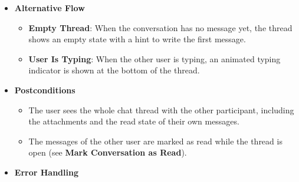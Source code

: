 \begin{itemize}[leftmargin=1.6em,topsep=4pt,itemsep=3pt,parsep=0pt,label=$\bullet$]
\begin{itemize}[leftmargin=2.2em,topsep=2pt,itemsep=3pt,parsep=0pt,label=$\circ$]
\begin{itemize}[leftmargin=2.2em,topsep=2pt,itemsep=3pt,parsep=0pt,label=$\blacksquare$]
                    \item A message that contains only emojis is displayed with a larger font.
                \end{itemize}
            \item \textbf{Check the Read State}: Messages that the user has sent show a read indicator.
                \begin{itemize}[leftmargin=2.2em,topsep=2pt,itemsep=3pt,parsep=0pt,label=$\blacksquare$]
                    \item A single check mark means that the message has been delivered but not read.
                    \item A double check mark means that the other user has read the message.
                \end{itemize}
            \item \textbf{Use the Thread Actions}: The user can send a message (see \textbf{Send Message}), attach a file (see \textbf{Send File}) or delete one of their own messages (see \textbf{Delete Message}).
        \end{itemize}
    \item \textbf{Alternative Flow}

        \begin{itemize}[leftmargin=2.2em,topsep=2pt,itemsep=3pt,parsep=0pt,label=$\circ$]
            \item \textbf{Empty Thread}: When the conversation has no message yet, the thread shows an empty state with a hint to write the first message.
            \item \textbf{User Is Typing}: When the other user is typing, an animated typing indicator is shown at the bottom of the thread.
        \end{itemize}
    \item \textbf{Postconditions}

        \begin{itemize}[leftmargin=2.2em,topsep=2pt,itemsep=3pt,parsep=0pt,label=$\circ$]
            \item The user sees the whole chat thread with the other participant, including the attachments and the read state of their own messages.
            \item The messages of the other user are marked as read while the thread is open (see \textbf{Mark Conversation as Read}).
        \end{itemize}
    \item \textbf{Error Handling}


\end{itemize}
